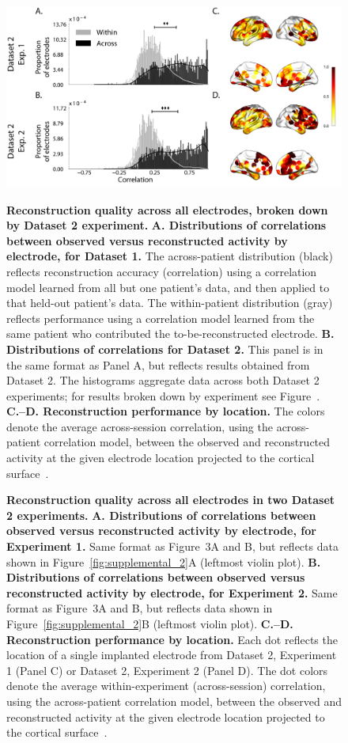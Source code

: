 \documentclass[10pt]{article}
\begin{document}
\begin{figure}[p]
\centering
\includegraphics[width=\textwidth]{figs/supplemental_3}
\caption{\textbf{Reconstruction quality across all electrodes, broken
    down by Dataset 2 experiment.}  \textbf{A. Distributions of correlations
      between observed versus reconstructed activity by electrode, for
      Dataset 1.}  The across-patient distribution (black) reflects
    reconstruction accuracy (correlation) using a correlation model
    learned from all but one patient's data, and then applied to that
    held-out patient's data.  The within-patient distribution (gray)
    reflects performance using a correlation model learned from the same
    patient who contributed the to-be-reconstructed electrode.
    \textbf{B. Distributions of correlations for Dataset 2.}  This
    panel is in the same format as Panel A, but reflects results
    obtained from Dataset 2.  The histograms aggregate data across
    both Dataset 2 experiments; for results broken down by experiment
    see Figure~\perexptaskreconseparated. \textbf{C.--D.  Reconstruction
      performance by location.} The colors denote the average across-session
    correlation, using the across-patient correlation model, between
    the observed and reconstructed activity at the given electrode
    location projected to the cortical surface~\citep{CombEtal19}.}


\caption{\textbf{Reconstruction quality across all electrodes in two
      Dataset 2 experiments.}  \textbf{A. Distributions of correlations
      between observed versus reconstructed activity by electrode, for
      Experiment 1.}  Same format as Figure~3A and B, but reflects data shown
    in Figure~\ref{fig:supplemental_2}A (leftmost violin plot).
 \textbf{B. Distributions of correlations
      between observed versus reconstructed activity by electrode, for
      Experiment 2.}  Same format as Figure~3A and B, but reflects
    data shown in Figure~\ref{fig:supplemental_2}B (leftmost violin
    plot).  \textbf{C.--D.  Reconstruction
      performance by location.} Each dot reflects the location of a
    single implanted electrode from Dataset 2, Experiment 1 (Panel C)
    or Dataset 2, Experiment 2 (Panel D).  The dot colors denote the
    average within-experiment (across-session)
    correlation, using the across-patient correlation model, between
    the observed and reconstructed activity at the given electrode
    location projected to the cortical surface~\citep{CombEtal19}.}
\label{fig:supplemental_3}
\end{figure}
\end{document}
